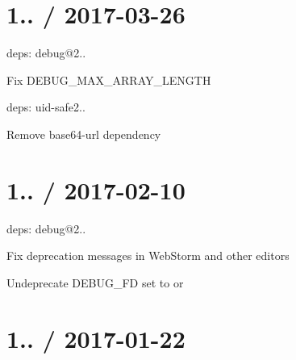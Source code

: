 \section*{1.. / 2017-\/03-\/26 }


\begin{DoxyItemize}
\item deps\+: debug@2..
\begin{DoxyItemize}
\item Fix {\ttfamily D\+E\+B\+U\+G\+\_\+\+M\+A\+X\+\_\+\+A\+R\+R\+A\+Y\+\_\+\+L\+E\+N\+G\+TH}
\end{DoxyItemize}
\item deps\+: uid-\/safe2..
\begin{DoxyItemize}
\item Remove {\ttfamily base64-\/url} dependency
\end{DoxyItemize}
\end{DoxyItemize}

\section*{1.. / 2017-\/02-\/10 }


\begin{DoxyItemize}
\item deps\+: debug@2..
\begin{DoxyItemize}
\item Fix deprecation messages in Web\+Storm and other editors
\item Undeprecate {\ttfamily D\+E\+B\+U\+G\+\_\+\+FD} set to {} or {}
\end{DoxyItemize}
\end{DoxyItemize}

\section*{1.. / 2017-\/01-\/22 }


